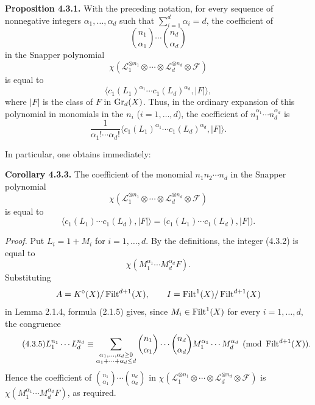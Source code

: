 \textbf{Proposition 4.3.1.}
With the preceding notation, for every sequence of nonnegative integers
$\alpha_1,\ldots,\alpha_d$ such that
$\sum_{i=1}^d\alpha_i=d$, the coefficient of
\[
\binom{n_1}{\alpha_1}\cdots\binom{n_d}{\alpha_d}
\]
in the Snapper polynomial
\[
\chi(\mathcal L_1^{\otimes n_1}\otimes\cdots\otimes
\mathcal L_d^{\otimes n_d}\otimes\mathcal F)
\]
is equal to
\begin{equation}\tag{4.3.2}
\bigl\langle c_1(L_1)^{\alpha_1}\cdots
c_1(L_d)^{\alpha_d},\lvert F\rvert\bigr\rangle,
\end{equation}
where $\lvert F\rvert$ is the class of $F$ in $\operatorname{Gr}_d(X)$. Thus, in the ordinary
expansion of this polynomial in monomials in the $n_i$ ($i=1,\ldots,d$),
the coefficient of $n_1^{\alpha_1}\cdots n_d^{\alpha_d}$ is
\[
\frac{1}{\alpha_1!\cdots\alpha_d!}
\bigl\langle c_1(L_1)^{\alpha_1}\cdots
c_1(L_d)^{\alpha_d},\lvert F\rvert\bigr\rangle.
\]

In particular, one obtains immediately:

\textbf{Corollary 4.3.3.}
The coefficient of the monomial $n_1n_2\cdots n_d$ in the Snapper polynomial
\[
\chi(\mathcal L_1^{\otimes n_1}\otimes\cdots\otimes
\mathcal L_d^{\otimes n_d}\otimes\mathcal F)
\]
is equal to
\begin{equation}\tag{4.3.4}
\bigl\langle c_1(L_1)\cdots c_1(L_d),\lvert F\rvert\bigr\rangle
=\bigl(c_1(L_1)\cdots c_1(L_d),\lvert F\rvert\bigr).
\end{equation}

\emph{Proof.}
Put $L_i=1+M_i$ for $i=1,\ldots,d$. By the definitions, the integer (4.3.2)
is equal to
\[
\chi(M_1^{\alpha_1}\cdots M_d^{\alpha_d}F).
\]
Substituting
\[
A=K^\circ(X)/\operatorname{Filt}^{d+1}(X),
\qquad I=\operatorname{Filt}^1(X)/\operatorname{Filt}^{d+1}(X)
\]
in Lemma 2.1.4, formula (2.1.5) gives, since
$M_i\in\operatorname{Filt}^1(X)$ for every $i=1,\ldots,d$, the congruence
\begin{equation}\tag{4.3.5}
L_1^{n_1}\cdots L_d^{n_d}\equiv
\sum_{\substack{\alpha_1,\ldots,\alpha_d\geq0\\
\alpha_1+\cdots+\alpha_d\leq d}}
\binom{n_1}{\alpha_1}\cdots\binom{n_d}{\alpha_d}
M_1^{\alpha_1}\cdots M_d^{\alpha_d}
\pmod{\operatorname{Filt}^{d+1}(X)}.
\end{equation}
Hence the coefficient of
$\binom{n_1}{\alpha_1}\cdots\binom{n_d}{\alpha_d}$ in
$\chi(\mathcal L_1^{\otimes n_1}\otimes\cdots\otimes
\mathcal L_d^{\otimes n_d}\otimes\mathcal F)$ is
$\chi(M_1^{\alpha_1}\cdots M_d^{\alpha_d}F)$, as required.

